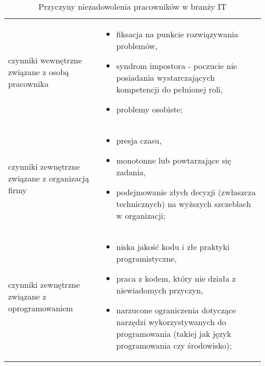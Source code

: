 \noindent\begin{minipage}{\textwidth}
             \begin{table}[H]
                 \raggedright\caption{Przyczyny niezadowolenia pracowników w branży IT\label{tabela:niezadowolenie-IT}}
                 \begin{center}
                     \begin{tabular}{|P{.2\textwidth}|P{.7\textwidth}|}

                         \hline
                          &
                          \\
                         \hline

                         czynniki wewnętrzne związane z osobą pracownika &
                         \begin{itemize}
                             \item fiksacja na punkcie rozwiązywania problemów,
                             \item syndrom impostora - poczucie nie posiadania wystarczających kompetencji do pełnionej roli,
                             \item problemy osobiste;
                         \end{itemize} \\

                         \hline

                         czynniki zewnętrzne związane z organizacją firmy &
                         \begin{itemize}
                             \item presja czasu,
                             \item monotonne lub powtarzające się zadania,
                             \item podejmowanie złych decyzji (zwłaszcza technicznych) na wyższych szczeblach w organizacji;
                         \end{itemize} \\

                         \hline

                         czynniki zewnętrzne związane z oprogramowaniem &
                         \begin{itemize}
                             \item niska jakość kodu i złe praktyki programistyczne,
                             \item praca z kodem, który nie działa z niewiadomych przyczyn,
                             \item narzucone ograniczenia dotyczące narzędzi wykorzystywanych do programowania (takiej jak język programowania czy środowisko);
                         \end{itemize} \\


\end{tabular}
\end{center}
\end{table}
\end{minipage}
